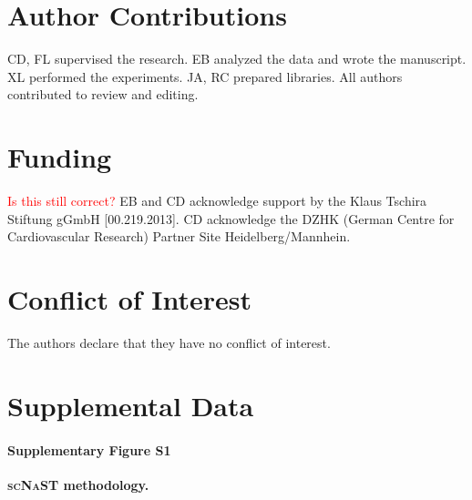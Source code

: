 \documentclass[utf8]{FrontiersinHarvard} %
\newcommand{\scnast}{\textsc{scNaST}\xspace}
\newcommand*{\red}{\textcolor{red}}
\begin{document}


\section*{Author Contributions}
CD, FL supervised the research.
EB analyzed the data and wrote the manuscript. 
XL performed the experiments.
JA, RC prepared libraries.
All authors contributed to review and editing.


\section*{Funding}
\red{Is this still correct?}
EB and CD acknowledge support by the Klaus Tschira Stiftung gGmbH [00.219.2013]. 
CD acknowledge the DZHK (German Centre for Cardiovascular Research) Partner Site Heidelberg/Mannhein.


\section*{Conflict of Interest}
The authors declare that they have no conflict of interest.


\section*{Supplemental Data}

\paragraph*{Supplementary Figure S1}
\label{fig:S1}
{\bf \scnast methodology.}
\end{document}

